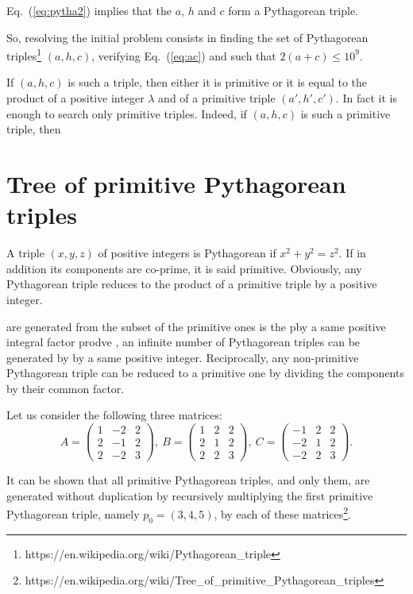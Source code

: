 \documentclass[11pt, twoside, a4paper]{article}
\newcommand{\Eq}[1]{Eq.~(\ref{#1})}
\begin{document}
\Eq{eq:pytha2} implies that the $a$, $h$ and $c$ form a Pythagorean triple.


So, resolving the initial problem consists in finding the set of Pythagorean triples\footnote{https://en.wikipedia.org/wiki/Pythagorean\_triple} $(a, h, c)$, verifying \Eq{eq:ac} and such that $2(a+c)\le10^9$.


If $(a, h, c)$ is such a triple, then either it is primitive or it is equal to the product of a positive integer $\lambda$ and of a primitive triple $(a', h', c')$. 
In fact it is enough to search only primitive triples. Indeed, if $(a, h, c)$ is such a primitive triple, then 


\section{Tree of primitive Pythagorean triples}
A triple $(x, y, z)$ of positive integers is Pythagorean if $x^2+y^2=z^2$. If in addition its components are co-prime, it is said primitive. Obviously, any Pythagorean triple reduces to the product of a primitive triple by a positive integer. 

 are generated from the subset of the primitive ones  is the pby a same positive integral factor prodve , an infinite number of Pythagorean triples can be generated by  by a same positive integer. Reciprocally, any non-primitive Pythagorean triple can be reduced to a primitive one by dividing the components by their common factor.

Let us consider the following three matrices:
\[
A = \left(\begin{matrix}  1 & -2 & 2 \\  2 & -1 & 2 \\  2 & -2 & 3 \end{matrix} \right)\!,\ 
B = \left(\begin{matrix}  1 &  2 & 2 \\  2 &  1 & 2 \\  2 &  2 & 3 \end{matrix} \right)\!,\
C = \left(\begin{matrix} -1 &  2 & 2 \\ -2 &  1 & 2 \\ -2 &  2 & 3 \end{matrix} \right)\!.
\]

It can be shown that all primitive Pythagorean triples, and only them, are generated without duplication by recursively multiplying the first primitive Pythagorean triple, namely $p_0=(3, 4, 5)$, by each of these matrices\footnote{https://en.wikipedia.org/wiki/Tree\_of\_primitive\_Pythagorean\_triples}.
\end{document}
